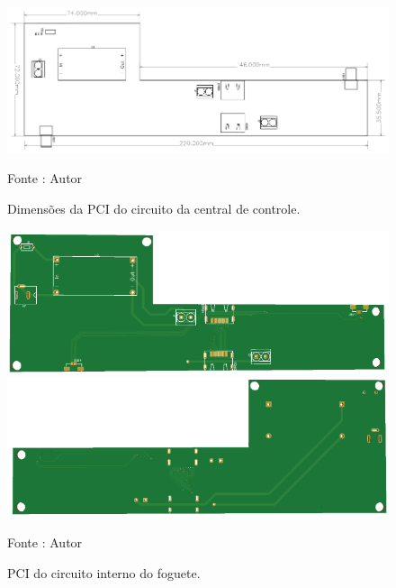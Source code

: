 \begin{figure}[H]
  \centering
  \includegraphics[scale=0.5]{figuras/PCB_Maleta.png}
  \caption{ Dimensões da PCI do circuito da central de controle.} 
  {\footnotesize Fonte : Autor } 
  \label{fig:PCIMaleta}
\end{figure}

\begin{figure}[H]
  \centering
  \includegraphics[scale=0.4]{figuras/PDFs/final eletronica/maleta_top.png}
    \includegraphics[scale=0.4]{figuras/PDFs/final eletronica/maleta_bottom.png}
  \caption{PCI do circuito interno do foguete. } 
  {\footnotesize Fonte : Autor } 
  \label{fig:PCB_controle}
\end{figure}
